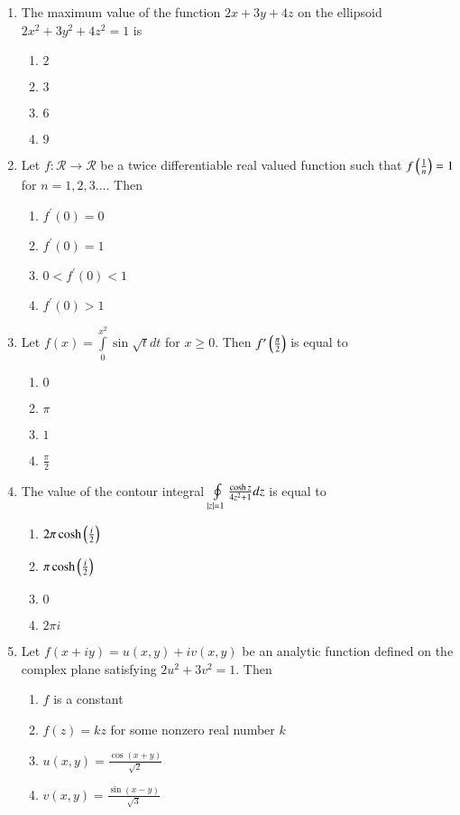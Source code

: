 \documentclass[journal,12pt,twocolumn]{IEEEtran}
\theoremstyle{remark}
\begin{document}
\begin{enumerate}
    \item The maximum value of the function $2x+3y+4z$ on the ellipsoid $2x^2+3y^2+4z^2=1$ is
        \begin{enumerate}
            \item $2$
            \item $3$
            \item $6$
            \item $9$
        \end{enumerate}

    \item Let $f:\mathcal{R}\to\mathcal{R}$ be a twice differentiable real valued function such that $f\left(\frac{1}{n}\right)=1$ for $n=1,2,3\dots$. Then
        \begin{enumerate}
            \item $f^\prime(0)=0$
            \item $f^\prime(0)=1$
            \item $0<f^\prime(0)<1$
            \item $f^\prime(0)>1$
        \end{enumerate}

    \item Let $f(x)=\int\limits_0^{x^2}\sin\sqrt{t}dt$ for $x\geq0$. Then $f^\prime\left(\frac{\pi}{2}\right)$ is equal to
        \begin{enumerate}
            \item $0$
            \item $\pi$
            \item $1$
            \item $\frac{\pi}{2}$
        \end{enumerate}

    \item The value of the contour integral $\oint\limits_{\left\vert z\right\vert=1}\frac{\cosh{z}}{4z^2+1}dz$ is equal to
        \begin{enumerate}
            \item $2\pi\cosh\left(\frac{i}{2}\right)$
            \item $\pi\cosh\left(\frac{i}{2}\right)$
            \item $0$
            \item $2\pi i$
        \end{enumerate}

    \item Let $f(x+iy)=u(x,y)+iv(x,y)$ be an analytic function defined on the complex plane satisfying $2u^2+3v^2=1$. Then
        \begin{enumerate}
            \item $f$ is a constant
            \item $f(z)=kz$ for some nonzero real number $k$
            \item $u(x,y)=\frac{\cos(x+y)}{\sqrt{2}}$
            \item $v(x,y)=\frac{\sin(x-y)}{\sqrt{3}}$
        \end{enumerate}


\end{enumerate}
\end{document}
